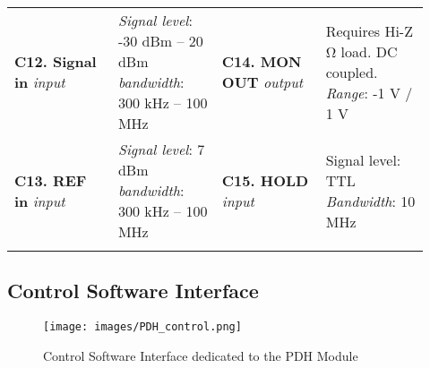 \begin{table}[ht]
    \centering
    \begin{tabular}{p{0.23\linewidth} p{0.23\linewidth} p{0.23\linewidth}  p{0.23\linewidth}}
    \hline
    \hline
    \addlinespace
        \textbf{C12. Signal in}
        \newline \textit{input}
    &   
        {\footnotesize \textit{Signal level}: 
        \newline \hspace*{\fill} -30 dBm – 20 dBm 
        \newline \textit{bandwidth}:
        \newline \hspace*{\fill} 300 kHz – 100 MHz }
    &
        \textbf{C14. MON OUT}
        \newline \textit{output}
    &
        {\footnotesize Requires Hi-Z \si{\ohm} load.
        \newline DC coupled.
        \newline \textit{Range}: \hspace*{\fill} -1 V / 1 V }
    \\
    
    \addlinespace
    
         \textbf{C13. REF in}  
        \newline \textit{input}
    &   
        {\footnotesize \textit{Signal level}: \hspace*{\fill} 7 dBm 
        \newline \textit{bandwidth}:
        \newline \hspace*{\fill} 300 kHz – 100 MHz }
    &
        \textbf{C15. HOLD}
        \newline \textit{input}
    &
        {\footnotesize Signal level: \hspace*{\fill}TTL
        \newline \textit{Bandwidth}: \hspace*{\fill} 10 MHz }
    \\
    \addlinespace
    \hline
    \hline
    
    \end{tabular}
\end{table}





\subsection{Control Software Interface} \label{PDH_SW_chapter}
\begin{figure}
    \centering
    \texttt{[image: images/PDH\_control.png]}
    \caption{Control Software Interface dedicated to the PDH Module}
    \label{PDH_SW_interface}
\end{figure}

